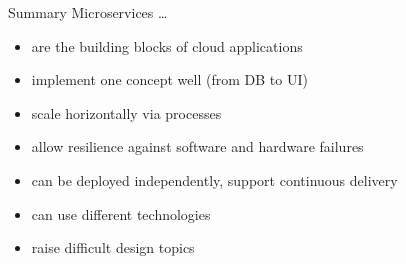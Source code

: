 \begin{frame}{Summary}
Microservices \ldots
\begin{itemize}
\item are the building blocks of cloud applications
\item implement one concept well (from DB to UI)
\item scale horizontally via processes
\item allow resilience against software and hardware failures
\item can be deployed independently, support continuous delivery
\item can use different technologies
\item raise difficult design topics
\end{itemize}
\end{frame}

